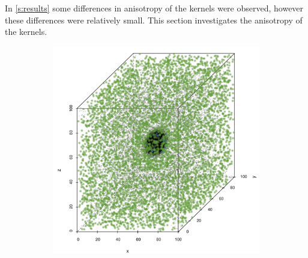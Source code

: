 
In \cref{s:results} some differences in anisotropy of the kernels were observed, however these differences were relatively small. This section investigates the anisotropy of the kernels. 
	
			\begin{figure}
				\centering
				\begin{subfigure}{0.23\textwidth}
					\centering
					\includegraphics[keepaspectratio=true, width=\textwidth, height=0.23\textheight]{discussion/img/ferdosi_1_60000_anisotropy.png}
					\caption{}
					\label{fig:discussion:anisotropy:ferdosi1}
				\end{subfigure}
				\begin{subfigure}{0.23\textwidth}
					\centering

\end{subfigure}
\end{figure}
